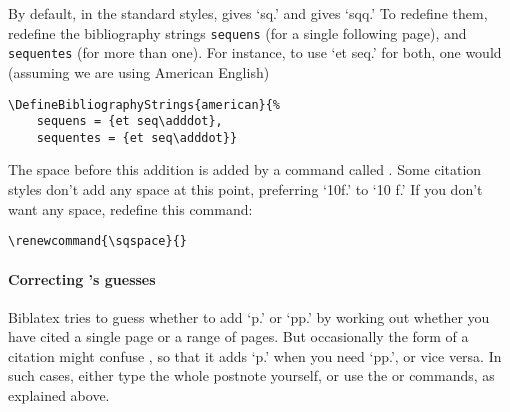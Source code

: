 By default, in the standard styles,  gives `sq.' and 
gives `sqq.' To redefine them, redefine the bibliography strings
\verb|sequens| (for a single following page), and \verb|sequentes|
(for more than one). For instance, to use `et seq.' for both, one
would (assuming we are using American English)
\begin{verbatim}
\DefineBibliographyStrings{american}{%
    sequens = {et seq\adddot},
    sequentes = {et seq\adddot}}
\end{verbatim}
The space before this addition is added by a command called
. Some citation styles don't add any space at this point,
preferring `10f.' to `10 f.' If you don't want any space, redefine
this command:
\begin{center}
\verb|\renewcommand{\sqspace}{}|
\end{center}

\paragraph{Correcting \biblatex's guesses} \textsf{Biblatex} tries to
guess whether to add `p.' or `pp.' by working out whether you have
cited a single page or a range of pages. But occasionally the form of
a citation might confuse \biblatex, so that it adds `p.' when you need
`pp.', or vice versa. In such cases, either type the whole postnote
yourself, or use the  or  commands, as explained
above.

